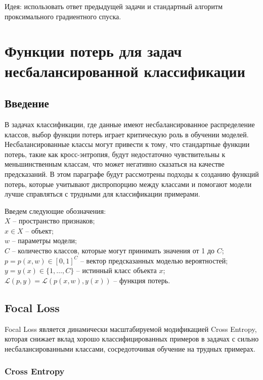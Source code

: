 Идея: использовать ответ предыдущей задачи и стандартный алгоритм проксимального градиентного спуска.


\section*{Функции потерь для задач несбалансированной классификации}

\subsection*{Введение}

В задачах классификации, где данные имеют несбалансированное распределение классов, выбор функции потерь играет критическую роль в обучении моделей. Несбалансированные классы могут привести к тому, что стандартные функции потерь, такие как кросс-энтропия, будут недостаточно чувствительны к меньшинственным классам, что может негативно сказаться на качестве предсказаний. В этом параграфе будут рассмотрены подходы к созданию функций потерь, которые учитывают диспропорцию между классами и помогают модели лучше справляться с трудными для классификации примерами.

Введем следующие обозначения:
\\\indent $X$ -- пространство признаков;
\\\indent $x \in X$ -- объект;
\\\indent $w$ -- параметры модели;
\\\indent $C$ -- количество классов, которые могут принимать значения от 1 до $C$;
\\\indent $p=p(x,w) \in [0, 1]^C$ -- вектор предсказанных моделью вероятностей;
\\\indent $y=y(x) \in \{1,\ldots,C\}$ -- истинный класс объекта $x$;
\\\indent $\mathcal{L}(p,y) = \mathcal{L}(p(x, w), y(x))$ -- функция потерь.

\subsection*{Focal Loss}

Focal Loss является динамически масштабируемой модификацией Cross Entropy, которая снижает вклад хорошо классифицированных примеров в задачах с сильно несбалансированными классами, сосредоточивая обучение на трудных примерах.

\subsubsection*{Cross Entropy}

